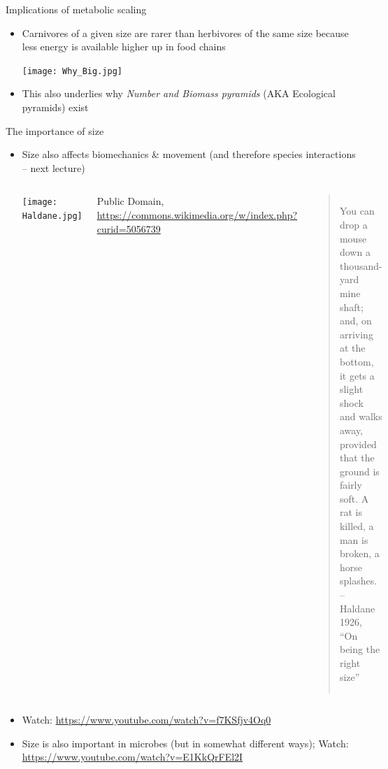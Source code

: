 \begin{frame}{Implications of metabolic scaling}

  \begin{itemize}[<+->]
    \item Carnivores of a given size are rarer than herbivores of the same size  because less energy is available higher up in food chains
    \begin{center}
        \texttt{[image: Why\_Big.jpg]}
    \end{center}
    \item This also underlies why {\it Number and Biomass pyramids} (AKA Ecological pyramids) exist
\end{itemize}

\end{frame}
\begin{frame}{The importance of size}

\begin{itemize}[<+->]\setlength{\itemindent}{0em}\itemsep4pt
    \item Size also affects biomechanics \& movement (and therefore species interactions -- next lecture)
  \begin{columns}[c]
    \centering
      \vspace*{\fill} 
      \texttt{[image: Haldane.jpg]}\\
      {\tiny Public Domain, \url{https://commons.wikimedia.org/w/index.php?curid=5056739}\par} 
      \vspace*{\fill}
    \centering
    \vspace*{\fill} 
    \begin{quote} 
      You can drop a mouse down a thousand-yard mine shaft; and, on 
      arriving at the bottom, it gets a slight shock and walks away, 
      provided that the ground is fairly soft. A rat is killed, a man is 
      broken, a horse splashes. \\
      \centering
      \hfill -- {\small Haldane 1926, ``On being the right size''}
      \end{quote}
    \vspace*{\fill}
  \end{columns}

  \item Watch: \small \url{https://www.youtube.com/watch?v=f7KSfjv4Oq0} 

  \item Size is also important in microbes (but in somewhat different ways); Watch: \small \url{https://www.youtube.com/watch?v=E1KkQrFEl2I}   

\end{itemize}

\end{frame}

